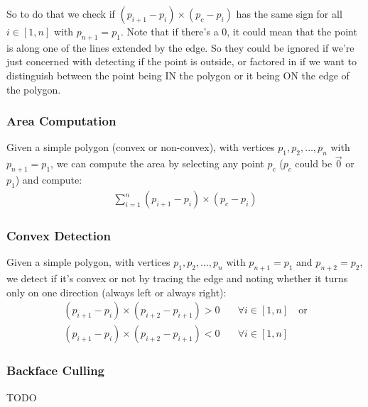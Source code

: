 \documentclass[12pt]{report}
\begin{document}
So to do that we check if $(p_{i+1} - p_i) \times (p_c - p_i)$ has the same sign for all $i \in [1,n]$ with $p_{n + 1} = p_1$. Note that if there's a $0$, it could mean that the point is along one of the lines extended by the edge. So they could be ignored if we're just concerned with detecting if the point is outside, or factored in if we want to distinguish between the point being IN the polygon or it being ON the edge of the polygon.
		
\subsubsection{Area Computation}
Given a simple polygon (convex or non-convex), with vertices $p_1, p_2, \dots, p_n$ with $p_{n+1} = p_1$, we can compute the area by selecting any point $p_c$ ($p_c$ could be $\vec{0}$ or $p_1$) and compute:
\begin{align}
	\sum_{i = 1}^{n} (p_{i + 1} - p_i) \times (p_c - p_i) 
\end{align}
\subsubsection{Convex Detection}
Given a simple polygon, with vertices $p_1, p_2, \dots, p_n$ with $p_{n+1} = p_1$ and $p_{n+2} = p_2$, we detect if it's convex or not by tracing the edge and noting whether it turns only on one direction (always left or always right):
\begin{align*}
	(p_{i + 1} - p_i) \times (p_{i + 2} - p_{i + 1}) > 0 & \quad \forall i \in [1,n] \quad \text{or} \\
	(p_{i + 1} - p_i) \times (p_{i + 2} - p_{i + 1}) < 0 & \quad \forall i \in [1,n]                 
\end{align*}
\subsubsection{Backface Culling}
TODO
\end{document}
